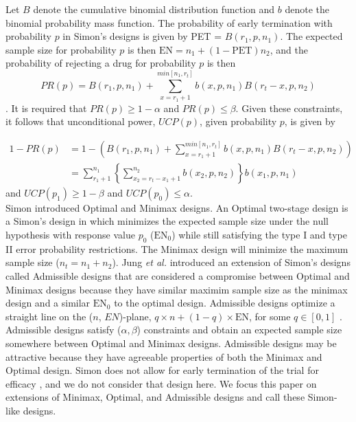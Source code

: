 \documentclass[12pt]{report}\usepackage[]{graphicx}\usepackage[]{color}
\newlength{\li}\setlength{\li}{14.48pt}
\newlength{\di}\setlength{\di}{-3.5mm}
\begin{document}
\indent Let $B$ denote the cumulative binomial distribution function and $b$ denote the binomial probability mass function. The probability of early termination with probability $p$ in Simon's designs is given by PET = $B(r_1, p, n_1)$. The expected sample size for probability $p$ is then $\mbox{EN} = n_1 + (1-\mbox{PET})n_2$, and the probability of rejecting a drug for probability $p$ is then  $$PR(p) = B(r_1, p, n_1) + \sum_{x=r_1+1}^{min[n_1,{r_t}]} b(x, p, n_1) B(r_t-x,p,n_2)$$. It is required that $PR(p) \geq 1-\alpha$ and $PR(p) \leq \beta$. Given these constraints, it follows that unconditional power, $UCP(p)$, given probability $p$, is given by 

\begin{equation*}
\begin{aligned}
1-PR(p) &= 1 - \left( B(r_1, p, n_1) + \sum_{x=r_1+1}^{min[n_1,{r_t}]} b(x, p, n_1) B(r_t-x,p,n_2) \right) \\
&= \sum_{r_1+1}^{n_1} \left\{\sum_{x_2 = r_t-x_1+1}^{n_2} b(x_2, p, n_2) \right\} b(x_1, p, n_1)
\end{aligned}
\end{equation*}
and $UCP(p_1) \geq 1-\beta$ and $UCP(p_0) \leq \alpha$. \\


\indent Simon introduced Optimal and Minimax designs. An Optimal two-stage design is a Simon's design in which minimizes the expected sample size under the null hypothesis with response value $p_0$ ($\mbox{EN}_0$) while still satisfying the type I and type II error probability restrictions. The Minimax design will minimize the maximum sample size ($n_t = n_1 + n_2$). Jung \textit{et al.} \cite{Jung} introduced an extension of Simon's designs called Admissible designs that are considered a compromise between Optimal and Minimax designs because they have similar maximim sample size as the minimax design and a similar $\mbox{EN}_0$ to the optimal design.  Admissible designs optimize a straight line on the ($n$, $EN$)-plane, $q \times n + (1-q) \times \mbox{EN}$, for some $q \in [0,1]$ \cite{Jung}. Admissible designs satisfy ($\alpha, \beta$) constraints and obtain an expected sample size somewhere between Optimal and Minimax designs. Admissible designs may be attractive because they have agreeable properties of both the Minimax and Optimal design.  Simon does not allow for early termination of the trial for efficacy \cite{Simon}, and we do not consider that design here. We focus this paper on extensions of Minimax, Optimal, and Admissible designs and call these Simon-like designs. 
\end{document}
